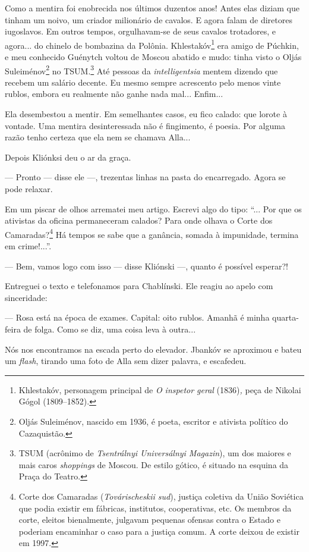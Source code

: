 Como a mentira foi enobrecida nos últimos duzentos anos! Antes elas
diziam que tinham um noivo, um criador milionário de cavalos. E agora
falam de diretores iugoslavos. Em outros tempos, orgulhavam-se de seus
cavalos trotadores, e agora... do chinelo de bombazina da Polônia.
Khlestakóv\footnote{Khlestakóv, personagem principal de \emph{O inspetor
  geral} (1836)\emph{,} peça de Nikolai Gógol (1809--1852).} era amigo
de Púchkin, e meu conhecido Guénytch voltou de Moscou abatido e mudo:
tinha visto o Oljás Suleiménov\footnote{Oljás Suleiménov, nascido em
  1936, é poeta, escritor e ativista político do Cazaquistão.} no
TSUM.\footnote{TSUM (acrônimo de \emph{Tsentrálnyi Universálnyi
  Magazin}), um dos maiores e mais caros \emph{shoppings} de Moscou. De
  estilo gótico, é situado na esquina da Praça do Teatro.} Até pessoas
da \emph{intelligentsia} mentem dizendo que recebem um salário decente.
Eu mesmo sempre acrescento pelo menos vinte rublos, embora eu realmente
não ganhe nada mal... Enfim...

Ela desembestou a mentir. Em semelhantes casos, eu fico calado: que
lorote à vontade. Uma mentira desinteressada não é fingimento, é poesia.
Por alguma razão tenho certeza que ela nem se chamava Alla...

Depois Kliónksi deu o ar da graça.

--- Pronto --- disse ele ---, trezentas linhas na pasta do encarregado.
Agora se pode relaxar.

Em um piscar de olhos arrematei meu artigo. Escrevi algo do tipo: ``...
Por que os ativistas da oficina permaneceram calados? Para onde olhava o
Corte dos Camaradas?\footnote{Corte dos Camaradas (\emph{Továrischeskii
  sud}), justiça coletiva da União Soviética que podia existir em
  fábricas, institutos, cooperativas, etc. Os membros da corte, eleitos
  bienalmente, julgavam pequenas ofensas contra o Esta­do e poderiam
  encaminhar o caso para a justiça comum. A corte deixou de existir em
  1997.} Há tempos se sabe que a ganância, somada à impunidade, termina
em crime!...''.

--- Bem, vamos logo com isso --- disse Kliónski ---, quanto é possível
esperar?!

Entreguei o texto e telefonamos para Chablínski. Ele reagiu ao apelo com
sinceridade:

--- Rosa está na época de exames. Capital: oito rublos. Amanhã é minha
quarta-feira de folga. Como se diz, uma coisa leva à outra...

Nós nos encontramos na escada perto do elevador. Jbankóv se aproximou e
bateu um \emph{flash}, tirando uma foto de Alla sem dizer palavra, e
escafedeu.

